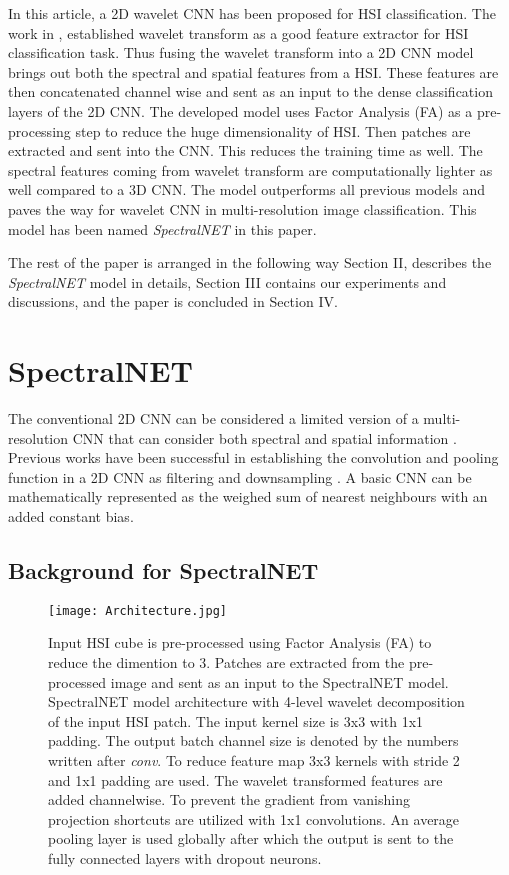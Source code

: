 \documentclass[journal]{IEEEtran}
\begin{document}
In this article, a 2D wavelet CNN has been proposed for HSI classification. The work in \cite{PRABHAKAR201737}, established wavelet transform as a good feature extractor for HSI classification task. Thus fusing the wavelet transform into a 2D CNN model brings out both the spectral and spatial features from a HSI. These features are then concatenated channel wise and sent as an input to the dense classification layers of the 2D CNN. The developed model uses Factor Analysis (FA) as a pre-processing step to reduce the huge dimensionality of HSI. Then patches are extracted and sent into the CNN. This reduces the training time as well. The spectral features coming from wavelet transform are computationally lighter as well compared to a 3D CNN. The model outperforms all previous models and paves the way for wavelet CNN in multi-resolution image classification. This model has been named \textit{SpectralNET} in this paper.  

The rest of the paper is arranged in the following way Section II, describes the \textit{SpectralNET} model in details, Section III contains our experiments and discussions, and the paper is concluded in Section IV.

\section{SpectralNET}

The conventional 2D CNN can be considered a limited version of a multi-resolution CNN that can consider both spectral and spatial information \cite{fujieda2018wavelet}. Previous works have been successful in establishing the convolution and pooling function in a 2D CNN as filtering and downsampling \cite{fujieda2017wavelet}. A basic CNN can be mathematically represented as the weighed sum of nearest neighbours with an added constant bias. 

\subsection{Background for SpectralNET}

\begin{figure*}[!tb]
    \centering
    \texttt{[image: Architecture.jpg]}
    \caption{Input HSI cube is pre-processed using Factor Analysis (FA) to reduce the dimention to 3. Patches are extracted from the pre-processed image and sent as an input to the SpectralNET model. SpectralNET model architecture with 4-level wavelet decomposition of the input HSI patch. The input kernel size is 3x3 with 1x1 padding. The output batch channel size is denoted by the numbers written after \textit{conv}. To reduce feature map 3x3 kernels with stride 2 and 1x1 padding are used. The wavelet transformed features are added channelwise. To prevent the gradient from vanishing projection shortcuts are utilized with 1x1 convolutions. An average pooling layer is used globally after which the output is sent to the fully connected layers with dropout neurons.}
    \label{fig:architecture}
\end{figure*}
\end{document}
